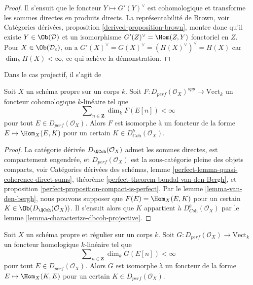 \begin{proof}
\medskip\noindent
Il s'ensuit que le foncteur $Y \mapsto G'(Y)^\vee$ est cohomologique
et transforme les sommes directes en produits directs. La représentabilité de Brown,
voir Catégories dérivées, proposition \ref{derived-proposition-brown},
montre donc qu'il existe $Y \in \Ob(\mathcal{D})$
et un isomorphisme
$G'(Z)^\vee = \Hom(Z, Y)$ fonctoriel en $Z$.
Pour $X \in \Ob(\mathcal{D}_c)$, on a
$G'(X)^\vee = G(X)^\vee = (H(X)^\vee)^\vee = H(X)$
car $\dim_k H(X) < \infty$, ce qui achève la démonstration.
\end{proof}

\begin{theorem}
\label{theorem-bondal-van-den-bergh}
\begin{reference}
Dans le cas projectif, il s'agit de \cite[Théorème A.1]{BvdB}
\end{reference}
Soit $X$ un schéma propre sur un corps $k$.
Soit $F : D_{perf}(\mathcal{O}_X)^{opp} \to \text{Vect}_k$
un foncteur cohomologique $k$-linéaire tel que
$$
\sum\nolimits_{n \in \mathbf{Z}} \dim_k F(E[n]) < \infty
$$
pour tout $E \in D_{perf}(\mathcal{O}_X)$. Alors $F$ est isomorphe à un foncteur
de la forme $E \mapsto \Hom_X(E, K)$ pour un certain
$K \in D^b_{\textit{Coh}}(\mathcal{O}_X)$.
\end{theorem}

\begin{proof}
La catégorie dérivée $D_\QCoh(\mathcal{O}_X)$ admet les sommes directes,
est compactement engendrée, et $D_{perf}(\mathcal{O}_X)$ est la sous-catégorie pleine
des objets compacts, voir
Catégories dérivées des schémas, lemme
\ref{perfect-lemma-quasi-coherence-direct-sums},
théorème \ref{perfect-theorem-bondal-van-den-Bergh}, et
proposition \ref{perfect-proposition-compact-is-perfect}.
Par le lemme \ref{lemma-van-den-bergh}, nous pouvons supposer que
$F(E) = \Hom_X(E, K)$ pour un certain $K \in \Ob(D_\QCoh(\mathcal{O}_X))$.
Il s'ensuit alors que $K$ appartient à $D^b_{\textit{Coh}}(\mathcal{O}_X)$
par le lemme \ref{lemma-characterize-dbcoh-projective}.
\end{proof}

\begin{lemma}
\label{lemma-homological-representable}
Soit $X$ un schéma propre et régulier sur un corps $k$.
Soit $G : D_{perf}(\mathcal{O}_X) \to \text{Vect}_k$
un foncteur homologique $k$-linéaire tel que
$$
\sum\nolimits_{n \in \mathbf{Z}} \dim_k G(E[n]) < \infty
$$
pour tout $E \in D_{perf}(\mathcal{O}_X)$. Alors $G$ est isomorphe à un foncteur
de la forme $E \mapsto \Hom_X(K, E)$ pour un certain $K \in D_{perf}(\mathcal{O}_X)$.
\end{lemma}

